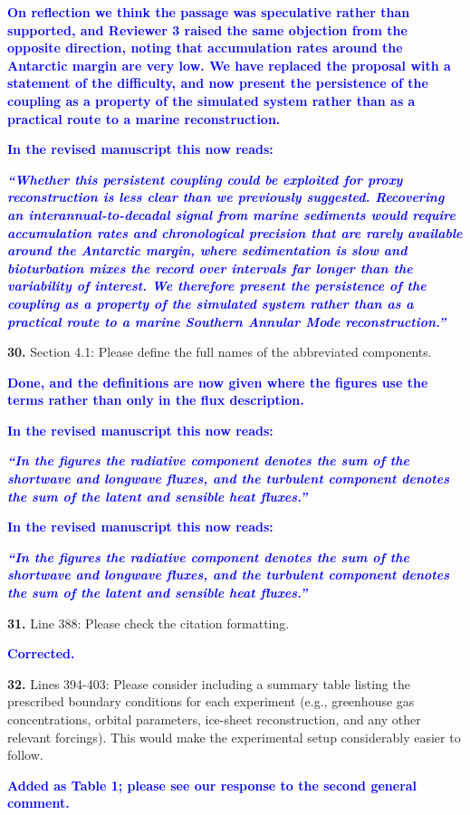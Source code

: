 \documentclass[pdflatex,sn-nature]{sn-jnl}
\begin{document}
\noindent\textcolor{blue}{\textbf{On reflection we think the passage was speculative rather than supported, and Reviewer 3 raised the same objection from the opposite direction, noting that accumulation rates around the Antarctic margin are very low. We have replaced the proposal with a statement of the difficulty, and now present the persistence of the coupling as a property of the simulated system rather than as a practical route to a marine reconstruction.}}


\noindent\textcolor{blue}{\textbf{In the revised manuscript this now reads:}}


\medskip
\noindent\textcolor{blue}{\textbf{\textit{``Whether this persistent coupling could be exploited for proxy reconstruction is less clear than we previously suggested. Recovering an interannual-to-decadal signal from marine sediments would require accumulation rates and chronological precision that are rarely available around the Antarctic margin, where sedimentation is slow and bioturbation mixes the record over intervals far longer than the variability of interest. We therefore present the persistence of the coupling as a property of the simulated system rather than as a practical route to a marine Southern Annular Mode reconstruction.''}}}
\medskip

\medskip
\noindent \textbf{30.} Section 4.1: Please define the full names of the abbreviated components.
\medskip

\noindent\textcolor{blue}{\textbf{Done, and the definitions are now given where the figures use the terms rather than only in the flux description.}}


\noindent\textcolor{blue}{\textbf{In the revised manuscript this now reads:}}


\medskip
\noindent\textcolor{blue}{\textbf{\textit{``In the figures the radiative component denotes the sum of the shortwave and longwave fluxes, and the turbulent component denotes the sum of the latent and sensible heat fluxes.''}}}
\medskip

\noindent\textcolor{blue}{\textbf{In the revised manuscript this now reads:}}


\medskip
\noindent\textcolor{blue}{\textbf{\textit{``In the figures the radiative component denotes the sum of the shortwave and longwave fluxes, and the turbulent component denotes the sum of the latent and sensible heat fluxes.''}}}
\medskip

\medskip
\noindent \textbf{31.} Line 388: Please check the citation formatting.
\medskip

\noindent\textcolor{blue}{\textbf{Corrected.}}


\medskip
\noindent \textbf{32.} Lines 394-403: Please consider including a summary table listing the prescribed boundary conditions for each experiment (e.g., greenhouse gas concentrations, orbital parameters, ice-sheet reconstruction, and any other relevant forcings). This would make the experimental setup considerably easier to follow.
\medskip

\noindent\textcolor{blue}{\textbf{Added as Table 1; please see our response to the second general comment.}}
\end{document}
